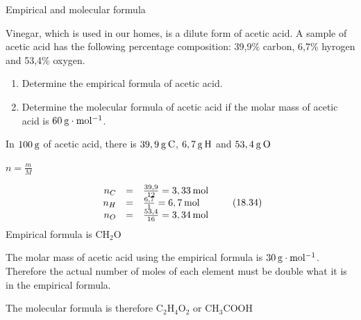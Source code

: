     \noindent
\label{m38712*secfhsst!!!underscore!!!id1308}\vspace{.5cm} 
      \noindent 
      \begin{wex}{Empirical and molecular formula
      }
 {
     \label{m38712*probfhsst!!!underscore!!!id1310}
      \label{m38712*id281533}Vinegar, which is used in our homes, is a dilute form of acetic acid. A sample of acetic acid has the following percentage composition: 39,9\% carbon, 6,7\% hyrogen and 53,4\% oxygen.\par 
      \label{m38712*id281540}\begin{enumerate}[noitemsep, label=\textbf{\arabic*}. ] 
            \leftskip=20pt\rightskip=\leftskip\label{m38712*uid71}\item Determine the empirical formula of acetic acid.
\label{m38712*uid72}\item Determine the molecular formula of acetic acid if the molar mass of acetic acid is $60\phantom{\rule{2pt}{0ex}}\mathrm{g}\ensuremath{\cdot}\mathrm{mol}{}^{-1}$.
\end{enumerate}
      \vspace{5pt}}
{
      \label{m38712*id281607}In $100\phantom{\rule{2pt}{0ex}}\mathrm{g}$ of acetic acid, there is $39,9\phantom{\rule{2pt}{0ex}}\mathrm{g}\phantom{\rule{2pt}{0ex}}\mathrm{C}$, $6,7\phantom{\rule{2pt}{0ex}}\mathrm{g}\phantom{\rule{2pt}{0ex}}\mathrm{H}$ and $53,4\phantom{\rule{2pt}{0ex}}\mathrm{g}\phantom{\rule{2pt}{0ex}}\mathrm{O}$\par 
      \pagebreak
      \label{m38712*id281633}
        $n=\frac{m}{M}$
      \par 
      \label{m38712*id281653}\nopagebreak\noindent{}
        
    \begin{equation}
    \begin{array}{ccc}\hfill {n}_{C}& =& \frac{39,9}{12}=3,33\phantom{\rule{2pt}{0ex}}\mathrm{mol}\hfill \\ \hfill {n}_{H}& =& \frac{6,7}{1}=6,7\phantom{\rule{2pt}{0ex}}\mathrm{mol}\hfill \\ \hfill {n}_{O}& =& \frac{53,4}{16}=3,34\phantom{\rule{2pt}{0ex}}\mathrm{mol}\hfill \end{array}\tag{18.34}
      \end{equation}
      \label{m38712*id281812}Empirical formula is $\mathrm{CH}{}_{2}\mathrm{O}$\par 
      \label{m38712*id281834}The molar mass of acetic acid using the empirical formula is $30\phantom{\rule{2pt}{0ex}}\mathrm{g}\ensuremath{\cdot}\mathrm{mol}{}^{-1}$. Therefore the actual number of moles of each element must be double what it is in the empirical formula.\par 
      \label{m38712*id281854}The molecular formula is therefore $\mathrm{C}{}_{2}\mathrm{H}{}_{4}\mathrm{O}{}_{2}$ or $\mathrm{CH}{}_{3}\mathrm{COOH}$\par 
}
    \end{wex}
